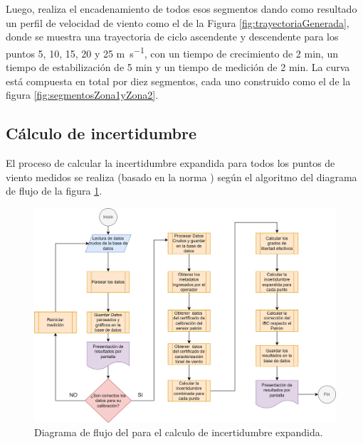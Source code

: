 Luego, realiza el encadenamiento de todos esos segmentos dando como resultado un perfil de velocidad de viento como el de la Figura \ref{fig:trayectoriaGenerada}, donde se muestra una trayectoria de ciclo ascendente y descendente para los puntos 5, 10, 15, 20 y 25 \unit{\meter\per\second}, con un tiempo de crecimiento de 2 \unit{\minute}, un tiempo de estabilización de 5 \unit{\minute} y un tiempo de medición de 2 \unit{\minute}. La curva está compuesta en total por diez segmentos, cada uno construido como el de la figura \ref{fig:segmentosZona1yZona2}.
\subsection{Cálculo de incertidumbre}\label{sec:calculoIncertidumbre}

El proceso de calcular la incertidumbre expandida para todos los puntos de viento medidos se realiza (basado en la norma \cite{GUM}) según el algoritmo del diagrama de flujo de la figura \ref{fig:DiagramaFlujoCalculoIncertidumbre}.

\begin{figure}[H]
    \centering
    \includegraphics[width=1\linewidth]{Figuras/AplicacionWeb/backend/DiagramaFlujoCalculoIncertidumbre.png}
    \caption{Diagrama de flujo del para el calculo de incertidumbre expandida.}
    \label{fig:DiagramaFlujoCalculoIncertidumbre}
\end{figure}

